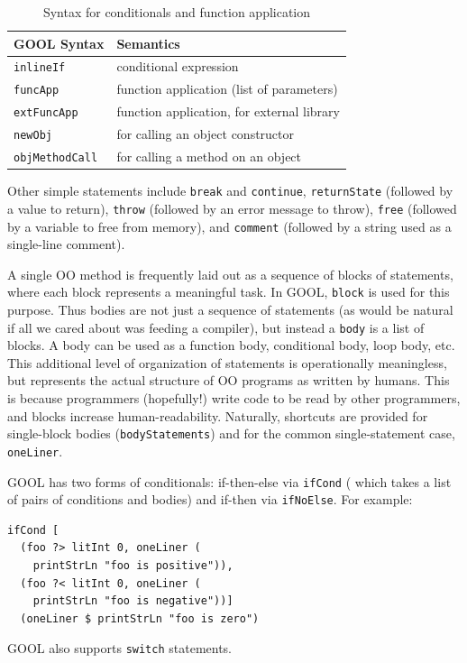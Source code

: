 \documentclass[sigplan,review,anonymous,prologue,dvipsnames]{acmart}
\begin{document}
\begin{table}[htb]
  \caption{Syntax for conditionals and function application}
  \begin{tabular}{p{} p{}}
    \textbf{GOOL Syntax} & \textbf{Semantics} \\
    \midrule
    \verb|inlineIf| & conditional expression \\
    \verb|funcApp| & function application (list of parameters) \\
    \verb|extFuncApp| & function application, for external library
    \\
    \verb|newObj| & for calling an object constructor \\
    \verb|objMethodCall| & for calling a method on an object \\
  \end{tabular}
  \label{tab:values}
\end{table}

Other simple statements include \verb|break| and \verb|continue|,
\verb|returnState| (followed by a value to return), \verb|throw| (followed by an
error message to throw), \verb|free| (followed by a variable to free from
memory), and \verb|comment| (followed by a string used as a
single-line comment).

A single OO method is frequently laid out as a sequence of blocks of
statements, where each block represents a meaningful task.  In GOOL,
\verb|block| is used for this purpose. Thus bodies are not just a
sequence of statements (as would be natural if all we cared about was
feeding a compiler), but instead a \verb|body| is a list of blocks.
A body can be used as a function body, conditional body, loop
body, etc. This additional level of organization of statements is
operationally meaningless, but represents the actual structure of OO programs
as written by humans.  This is because programmers (hopefully!) write code to
be read by other programmers, and blocks increase human-readability.
Naturally, shortcuts are provided for single-block bodies
(\verb|bodyStatements|) and for the common single-statement case,
\verb|oneLiner|.

GOOL has two forms of conditionals: if-then-else via \verb|ifCond| (
which takes a list of pairs of conditions and bodies) and
if-then via \verb|ifNoElse|.  For example:
\begin{lstlisting}
ifCond [
  (foo ?> litInt 0, oneLiner (
    printStrLn "foo is positive")),
  (foo ?< litInt 0, oneLiner (
    printStrLn "foo is negative"))]
  (oneLiner $ printStrLn "foo is zero")
\end{lstlisting}
GOOL also supports \verb|switch| statements.
\end{document}

